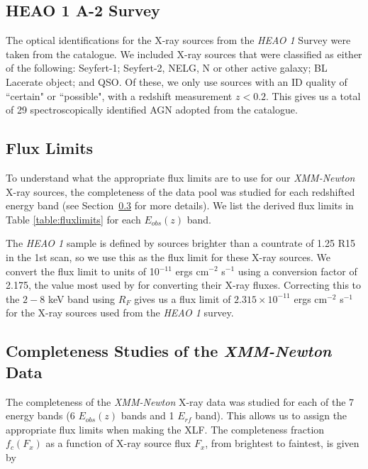\documentclass[fleqn,usenatbib]{mnras}
\begin{document}
	\subsection{HEAO 1 A-2 Survey}\label{subsec:heao1id}
	
	The optical identifications for the X-ray sources from the \textit{HEAO 1} Survey were taken from the \cite{piccinotti1982heao1xlf} catalogue.
	We included X-ray sources that were classified as either of the following: Seyfert-1; Seyfert-2, NELG, N or other active galaxy; BL Lacerate object; and QSO. 
    Of these, we only use sources with an ID quality of ``certain" or ``possible", with a redshift measurement $z < 0.2$.
    This gives us a total of 29 spectroscopically identified AGN adopted from the \cite{piccinotti1982heao1xlf} catalogue.
	
	
	\subsection{Flux Limits}\label{subsec:fluxlimits}  
	
	To understand what the appropriate flux limits are to use for our \textit{XMM-Newton} X-ray sources, the completeness of the data pool was studied for each redshifted energy band (see Section~\ref{subsec:completeness} for more details).
	We list the derived flux limits in Table \ref{table:fluxlimits} for each $E_{obs}(z)$ band.
	
    The \textit{HEAO 1} sample is defined by sources brighter than a countrate of 1.25 R15 in the 1st scan, so we use this as the flux limit for these X-ray sources.
    We convert the flux limit to units of 10$^{-11}$ ergs cm$^{-2}$ s$^{-1}$ using a conversion factor of 2.175, the value most used by \cite{piccinotti1982heao1xlf} for converting their X-ray fluxes.
    Correcting this to the $2-8$ keV band using $R_{F}$ gives us a flux limit of $2.315 \times 10^{-11}$ ergs cm$^{-2}$ s$^{-1}$ for the X-ray sources used from the \textit{HEAO 1} survey.
    

	\subsection{Completeness Studies of the \textit{XMM-Newton} Data}\label{subsec:completeness}  

    The completeness of the \textit{XMM-Newton} X-ray data was studied for each of the 7 energy bands (6 $E_{obs}(z)$ bands and 1 $E_{rf}$ band). 
    This allows us to assign the appropriate flux limits when making the XLF. 
    The completeness fraction $f_{c}(F_{x})$ as a function of X-ray source flux $F_{x}$, from brightest to faintest, is given by 
	
\end{document}
